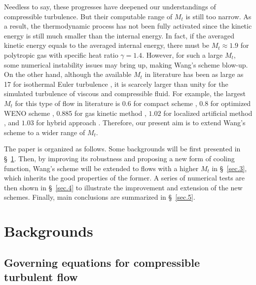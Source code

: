 \documentclass[review]{elsarticle}
\newcommand{\ga}{\gamma}
\begin{document}
Needless to say, these progresses have deepened our understandings of compressible turbulence. But their computable range of $M_t$ is still too narrow. As a result, the thermodynamic process has not been fully activated since the kinetic energy is still much smaller than the internal energy. In fact, if the averaged kinetic energy equals to the averaged internal energy, there must be $M_t \approx 1.9$ for polytropic gas with specific heat ratio $\ga = 1.4$. However, for such a large $M_t$, some numerical instability issues may bring up, making Wang's scheme blow-up. On the other hand, although the available $M_t$ in literature has been as large as 17 for isothermal Euler turbulence \citep{Federrath2013}, it is scarcely larger than unity for the simulated turbulence of viscous and compressible fluid. For example, the largest $M_t$ for this type of flow in literature is 0.6 for compact scheme \citep{Jagannathan2016}, 0.8 for optimized WENO scheme \citep{Pirozzoli2004}, 0.885 for gas kinetic method \citep{Lee2009}, $1.02$ for localized artificial method \citep{Xia2016}, and $1.03$ for hybrid approach \citep{Wang2012-prl}. Therefore, our present aim is to extend Wang's scheme to a wider range of $M_t$.

The paper is organized as follows. Some backgrounds will be first presented in \S~\ref{sec.2}. Then, by improving its robustness and proposing a new form of cooling function, Wang's scheme will be extended to flows with a higher $M_t$ in \S~\ref{sec.3}, which inherits the good properties of the former. A series of numerical tests are then shown in \S~\ref{sec.4} to illustrate the improvement and extension of the new schemes. Finally, main conclusions are summarized in \S~\ref{sec.5}.




\section{Backgrounds}\label{sec.2}

\subsection{Governing equations for compressible turbulent flow}\label{sec.2.1}
\end{document}
